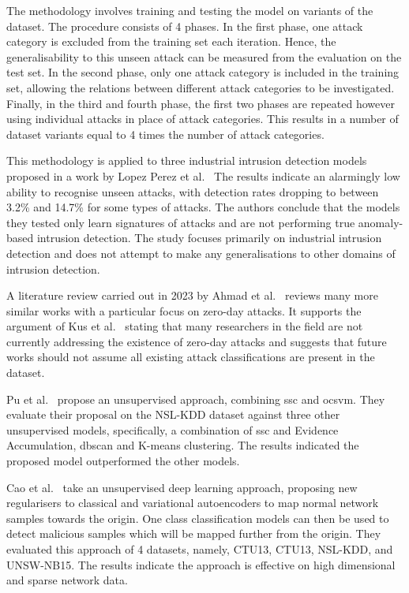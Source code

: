 The methodology involves training and testing the model on variants of the
dataset. The procedure consists of 4 phases. In the first phase, one attack
category is excluded from the training set each iteration. Hence, the
generalisability to this unseen attack can be measured from the evaluation on
the test set. In the second phase, only one attack category is included in the
training set, allowing the relations between different attack categories to be
investigated. Finally, in the third and fourth phase, the first two phases are
repeated however using individual attacks in place of attack categories. This
results in a number of dataset variants equal to 4 times the number of attack
categories.

This methodology is applied to three industrial intrusion detection models
proposed in a work by Lopez Perez et al.~\cite{Perez} The results indicate an
alarmingly low ability to recognise unseen attacks, with detection rates
dropping to between 3.2\% and 14.7\% for some types of attacks. The authors
conclude that the models they tested only learn signatures of attacks and are
not performing true anomaly-based intrusion detection. The study focuses
primarily on industrial intrusion detection and does not attempt to make any
generalisations to other domains of intrusion detection.

A literature review carried out in 2023 by Ahmad et al.~\cite{zero-day} reviews
many more similar works with a particular focus on zero-day attacks. It
supports the argument of Kus et al.~\cite{Kus} stating that many researchers in
the field are not currently addressing the existence of zero-day attacks and
suggests that future works should not assume all existing attack
classifications are present in the dataset.

Pu et al.~\cite{Pu} propose an unsupervised approach, combining \gls{ssc} and
\gls{ocsvm}. They evaluate their proposal on the NSL-KDD dataset against three
other unsupervised models, specifically, a combination of \gls{ssc} and
Evidence Accumulation, \gls{dbscan} and K-means clustering. The results indicated the
proposed model outperformed the other models.

Cao et al.~\cite{Cao} take an unsupervised deep learning approach, proposing new
regularisers to classical and variational autoencoders to map normal network
samples towards the origin. One class classification models can then be used to
detect malicious samples which will be mapped further from the origin. They
evaluated this approach of 4 datasets, namely, CTU13, CTU13, NSL-KDD,
and UNSW-NB15. The results indicate the approach is effective on high
dimensional and sparse network data.

